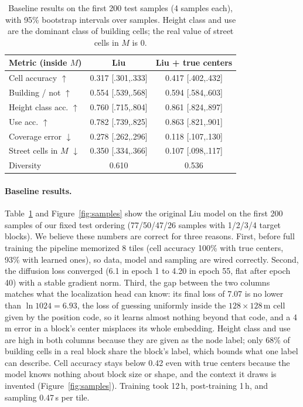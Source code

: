 \documentclass[twocolumn,11pt]{article}
\begin{document}
\begin{table}[t]
\centering\small
\setlength{\tabcolsep}{4pt}
\begin{tabular}{lcc}
\toprule
Metric (inside $M$) & Liu & Liu + true centers \\
\midrule
Cell accuracy $\uparrow$ & 0.317 {\scriptsize[.301,.333]} & 0.417 {\scriptsize[.402,.432]} \\
Building / not $\uparrow$ & 0.554 {\scriptsize[.539,.568]} & 0.594 {\scriptsize[.584,.603]} \\
Height class acc. $\uparrow$ & 0.760 {\scriptsize[.715,.804]} & 0.861 {\scriptsize[.824,.897]} \\
Use acc. $\uparrow$ & 0.782 {\scriptsize[.739,.825]} & 0.863 {\scriptsize[.821,.901]} \\
Coverage error $\downarrow$ & 0.278 {\scriptsize[.262,.296]} & 0.118 {\scriptsize[.107,.130]} \\
Street cells in $M$ $\downarrow$ & 0.350 {\scriptsize[.334,.366]} & 0.107 {\scriptsize[.098,.117]} \\
Diversity & 0.610 & 0.536 \\
\bottomrule
\end{tabular}
\caption{Baseline results on the first 200 test samples (4 samples each), with 95\% bootstrap intervals over samples. Height class and use are the dominant class of building cells; the real value of street cells in $M$ is 0.}
\label{tab:baseline}
\end{table}

\paragraph{Baseline results.} Table~\ref{tab:baseline} and Figure~\ref{fig:samples} show the original Liu model on the first 200 samples of our fixed test ordering (77/50/47/26 samples with 1/2/3/4 target blocks). We believe these numbers are correct for three reasons. First, before full training the pipeline memorized 8 tiles (cell accuracy 100\% with true centers, 93\% with learned ones), so data, model and sampling are wired correctly. Second, the diffusion loss converged (6.1 in epoch 1 to 4.20 in epoch 55, flat after epoch 40) with a stable gradient norm. Third, the gap between the two columns matches what the localization head can know: its final loss of 7.07 is no lower than $\ln 1024 = 6.93$, the loss of guessing uniformly inside the $128\times128$\,m cell given by the position code, so it learns almost nothing beyond that code, and a 4\,m error in a block's center misplaces its whole embedding. Height class and use are high in both columns because they are given as the node label; only 68\% of building cells in a real block share the block's label, which bounds what one label can describe. Cell accuracy stays below 0.42 even with true centers because the model knows nothing about block size or shape, and the context it draws is invented (Figure~\ref{fig:samples}). Training took 12\,h, post-training 1\,h, and sampling 0.47\,s per tile.
\end{document}
